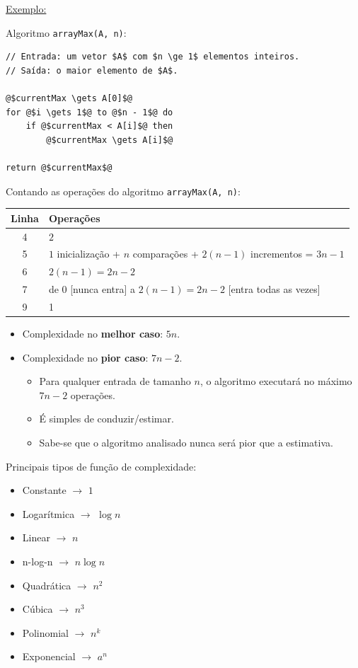 \bigskip

\underline{Exemplo:}

\medskip

Algoritmo \texttt{arrayMax(A, n)}:
\begin{verbatim}
// Entrada: um vetor $A$ com $n \ge 1$ elementos inteiros.
// Saída: o maior elemento de $A$.

@$currentMax \gets A[0]$@
for @$i \gets 1$@ to @$n - 1$@ do
	if @$currentMax < A[i]$@ then
		@$currentMax \gets A[i]$@

return @$currentMax$@
\end{verbatim}

\medskip

Contando as operações do algoritmo \texttt{arrayMax(A, n)}:

\begin{table}[H]
	\centering
	\small
	\begin{tabular}{c|l}
		Linha & Operações \\
		\hline
		4 & $2$ \\
		5 & $1$ inicialização + $n$ comparações + $2(n - 1)$ incrementos = $3n - 1$ \\
		6 & $2(n - 1) = 2n - 2$ \\
		7 & de $0$ [nunca entra] a $2(n - 1) = 2n - 2$ [entra todas as vezes] \\
		9 & 1
	\end{tabular}
\end{table}

\begin{itemize}
	\item Complexidade no \textbf{melhor caso}: $5n$.
	\item Complexidade no \textbf{pior caso}: $7n - 2$.
	\begin{itemize}
		\color{redtext}
		\item Para qualquer entrada de tamanho $n$, o algoritmo executará no máximo $7n - 2$ operações.
		\item É simples de conduzir/estimar.
		\item Sabe-se que o algoritmo analisado nunca será pior que a estimativa.
	\end{itemize}
\end{itemize}

\medskip

Principais tipos de função de complexidade:
\begin{itemize}
	\item Constante $\to$ $1$
	\item Logarítmica $\to$ $\log n$
	\item Linear $\to$ $n$
	\item n-log-n $\to$ $n \log n$
	\item Quadrática $\to$ $n^2$
	\item Cúbica $\to$ $n^3$
	\item Polinomial $\to$ $n^k$
	\item Exponencial $\to$ $a^n$
\end{itemize}

